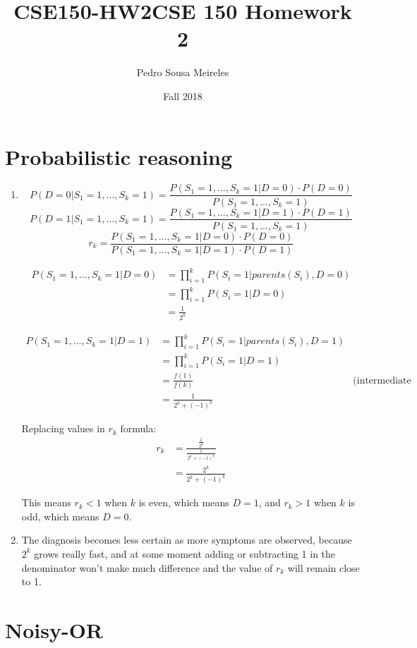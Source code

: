 \documentclass[11]{article}
\title{CSE150-HW2}
\title{CSE 150 Homework 2}
\date{Fall 2018}
\author{Pedro Sousa Meireles}
\begin{document}
\maketitle
\section{Probabilistic reasoning}
\begin{enumerate}[label=(\alph*)]
\item
$$P(D=0|S_1=1,...,S_k=1)=\frac{P(S_1=1,...,S_k=1|D=0)\cdot P(D=0)}{P(S_1=1,...,S_k=1)}$$
$$P(D=1|S_1=1,...,S_k=1)=\frac{P(S_1=1,...,S_k=1|D=1)\cdot P(D=1)}{P(S_1=1,...,S_k=1)}$$
$$r_k=\frac{P(S_1=1,...,S_k=1|D=0)\cdot P(D=0)}{P(S_1=1,...,S_k=1|D=1)\cdot P(D=1)}$$

\begin{align*}
P(S_1=1,...,S_k=1|D=0)&=\prod_{i=1}^k P(S_i=1|parents(S_i),D=0)\\
&=\prod_{i=1}^k P(S_i=1|D=0)\\
&= \frac{1}{2^k}
\end{align*}

\begin{align*}
P(S_1=1,...,S_k=1|D=1)&=\prod_{i=1}^k P(S_i=1|parents(S_i),D=1)\\
&=\prod_{i=1}^k P(S_i=1|D=1)\\
&=\frac{f(1)}{f(k)} & \text{(intermediate terms cancel each other in the productory)}\\
&=\frac{1}{2^k+(-1)^k}
\end{align*}

Replacing values in $r_k$ formula:
\begin{align*}
r_k&=\frac{\frac{1}{2^k}}{\frac{1}{2^k+(-1)^k}}\\
&=\frac{2^k}{2^k+(-1)^k}
\end{align*}

This means $r_k<1$ when $k$ is even, which means $D=1$, and $r_k>1$ when $k$ is odd, which means $D=0$.

\item
The diagnosis becomes less certain as more symptoms are observed, because $2^k$ grows really fast, and at some moment adding or subtracting 1 in the denominator won't make much difference and the value of $r_k$ will remain close to 1.
\end{enumerate}

\section{Noisy-OR}
\end{document}
